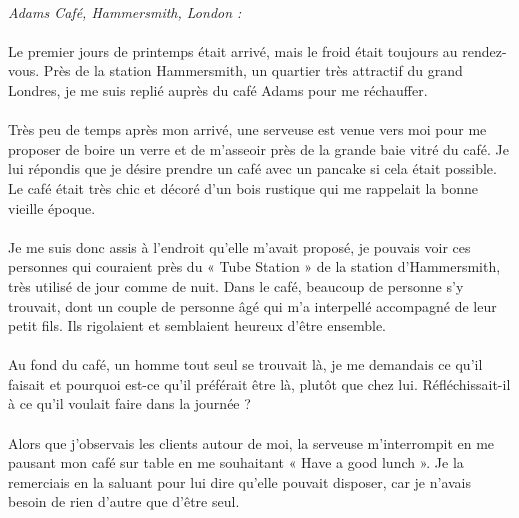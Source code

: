 \paragraph{}
\emph{Adams Café, Hammersmith, London :}

\paragraph{}
Le premier jours de printemps était arrivé, mais le froid était toujours au rendez-vous. Près de la station Hammersmith, un quartier très attractif du grand Londres, je me suis replié auprès du café Adams pour me réchauffer. 

\paragraph{}
Très peu de temps après mon arrivé, une serveuse est venue vers moi pour me proposer de boire un verre et de m’asseoir près de la grande baie vitré du café. Je lui répondis que je désire prendre un café avec un pancake si cela était possible. Le café était très chic et décoré d’un bois rustique qui me rappelait la bonne vieille époque. 

\paragraph{}
Je me suis donc assis à l’endroit qu’elle m’avait proposé, je pouvais voir ces personnes qui couraient près du « Tube Station » de la station d’Hammersmith, très utilisé de jour comme de nuit. Dans le café, beaucoup de personne s’y trouvait, dont un couple de personne âgé qui m’a interpellé accompagné de leur petit fils. Ils rigolaient et semblaient heureux d’être ensemble.

\paragraph{}
Au fond du café, un homme tout seul se trouvait là, je me demandais ce qu’il faisait et pourquoi est-ce qu’il préférait être là, plutôt que chez lui. Réfléchissait-il à ce qu’il voulait faire dans la journée ? 

\paragraph{}
Alors que j’observais les clients autour de moi, la serveuse m’interrompit en me pausant mon café sur table en me souhaitant « Have a good lunch ».  Je la remerciais en la saluant pour lui dire qu’elle pouvait disposer, car je n’avais besoin de rien d’autre que d’être seul.


